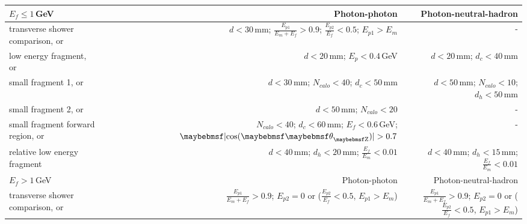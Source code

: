\begin{table}[htbp]
\centering

\smallskip

\begin{tabular}{l  r  r }
\hline
\hline
$E_f\leqslant1$\,GeV &  Photon-photon & Photon-neutral-hadron \\
\hline
\multicolumn{1}{L{0.3\textwidth}}{transverse shower comparison, or} & \multicolumn{1}{R{0.3\textwidth}}{$d < 30 $\,mm; $\frac{E_{p1}}{E_m + E_f} > 0.9 $; $\frac{E_{p2}}{E_f} < 0.5 $; $E_{p1} > E_m$}  & \multicolumn{1}{R{0.3\textwidth}}{-} \\
\multicolumn{1}{L{0.3\textwidth}}{low energy fragment, or} & \multicolumn{1}{R{0.3\textwidth}}{$d < 20 $\,mm; $E_p < 0.4 $\,GeV}  & \multicolumn{1}{R{0.3\textwidth}}{$d < 20 $\,mm; $d_c < 40 $\,mm} \\
\multicolumn{1}{L{0.3\textwidth}}{small fragment 1, or} & \multicolumn{1}{R{0.3\textwidth}}{$d < 30 $\,mm; $N_{calo} < 40 $; $d_c < 50 $\,mm}  & \multicolumn{1}{R{0.3\textwidth}}{$d < 50 $\,mm; $N_{calo} < 10 $; $d_h < 50$\,mm} \\
\multicolumn{1}{L{0.3\textwidth}}{small fragment 2, or} & \multicolumn{1}{R{0.3\textwidth}}{$d < 50 $\,mm; $N_{calo} < 20 $}  & \multicolumn{1}{R{0.3\textwidth}}{-} \\
\multicolumn{1}{L{0.3\textwidth}}{small fragment forward region, or} & \multicolumn{1}{R{0.3\textwidth}}{$N_{calo} < 40$; $d_c < 60$\,mm; $E_f < 0.6$\,GeV; $\absCosTheta > 0.7$}  & \multicolumn{1}{R{0.3\textwidth}}{-} \\
\multicolumn{1}{L{0.3\textwidth}}{relative low energy fragment} & \multicolumn{1}{R{0.3\textwidth}}{$d < 40$\,mm; $d_h < 20$\,mm; $\frac{E_{f}}{E_m} < 0.01$}  & \multicolumn{1}{R{0.3\textwidth}}{$d < 40$\,mm; $d_h < 15$\,mm; $\frac{E_{f}}{E_m} < 0.01$} \\
\hline
$E_f>1$\,GeV &  Photon-photon & Photon-neutral-hadron \\
\hline
\multicolumn{1}{L{0.3\textwidth}}{transverse shower comparison, or} & \multicolumn{1}{R{0.3\textwidth}}{$\frac{E_{p1}}{E_m + E_f} > 0.9 $; $E_{p2} = 0$ or ($\frac{E_{p2}}{E_f} < 0.5 $, $E_{p1} > E_m$)}  & \multicolumn{1}{R{0.3\textwidth}}{$\frac{E_{p1}}{E_m + E_f} > 0.9 $; $E_{p2} = 0$ or ($\frac{E_{p2}}{E_f} < 0.5 $, $E_{p1} > E_m$)} \\

\end{tabular}
\end{table}
